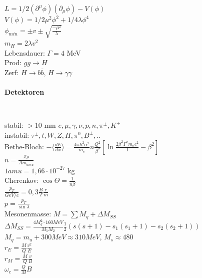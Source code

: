 \documentclass[12pt,a4paper]{article}
\renewcommand{\d}[2]{\frac{d #1}{d #2}}
\renewcommand{\=}[1]{\stackrel{#1}{=}}
\theoremstyle{definition}
\theoremstyle{remark}
\begin{document}
$L = 1/2 (\partial^{\mu} \phi) (\partial_{\mu} \phi) - V(\phi)$\\
$V(\phi) = 1/2 \mu^2 \phi^2  + 1/4 \lambda \phi^4$\\
$\phi_{min} = \pm v \pm \sqrt{\frac{-\mu^2}{\lambda}}$\\
$m_H = 2 \lambda v^2$\\
Lebensdauer: $\Gamma = 4$ MeV\\
Prod: $gg \rightarrow H$\\
Zerf: $H \rightarrow b \bar b$, $H \rightarrow \gamma \gamma$

\paragraph{Detektoren}

\begin{center}
\begin{minipage}[t]{.35\linewidth}
\vspace{0pt}
\noindent\begin{tabular}{ll}
\toprule

\bottomrule
\end{tabular}
\end{minipage}%
\begin{minipage}[t]{.65\linewidth}
\vspace{0pt}
\begin{tabular}{ll}
\toprule


\end{tabular}
\end{minipage}
\end{center}

stabil: $>$10 mm
$e, \mu, \gamma, \nu, p, n, \pi^{\pm}, K^{\pm}$\\
instabil:
$\tau^{\pm}, t, W, Z, H, \pi^0, B^{\pm}, ..$\\
Bethe-Bloch:
$- \langle \d{E}{x} \rangle = \frac{4\pi \hbar^2 \alpha^2}{m_e} n \frac{Q^2}{\beta^2} [\ln \frac{2 \beta^2 \Gamma^2 m_e c^2}{I} - \beta^2]$\\
$n = \frac{Z \rho}{A m_{amu}}$\\
$1 amu = 1,66 \cdot 10^{-27}$ kg\\
Cherenkov: $\cos \Theta = \frac{1}{n \beta}$\\
$\frac{p_T}{GeV/c} = 0,3 \frac{B}{T} \frac{r}{m}$\\
$p = \frac{p_T}{\sin \lambda}$\\
Mesonenmasse: $M = \sum M_q + \Delta M_{SS}$\\
$\Delta M_{SS} = \frac{4M_q^2 \cdot 160 MeV}{M_1 M_2} \frac{1}{2} (s(s+1) - s_1 (s_1 + 1) - s_2 (s_2 + 1))$\\
$M_q = m_u + 300 MeV \approx 310 MeV$, $M_s \approx 480$\\
$r_E = \frac{M}{Q} \frac{v^2}{E}$\\
$r_M = \frac{M}{Q} \frac{v}{B}$\\
$\omega_c = \frac{Q}{M}B$
\end{document}

